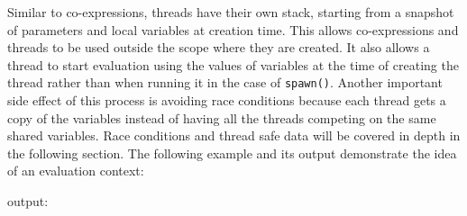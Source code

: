 Similar to co-expressions, threads have their own stack, starting from a
snapshot of parameters and local variables at creation time. This
allows co-expressions and threads to be used outside the scope where
they are created. It also allows a thread to start evaluation using the
values of variables at the time of creating the thread rather than when
running it in the case of \texttt{spawn()}. Another
important side effect of this process is avoiding race conditions
because each thread gets a copy of the variables instead of having all
the threads competing on the same shared variables. Race conditions and
thread safe data will be covered in depth in the following section. The
following example and its output demonstrate the idea of an evaluation
context:


\noindent
output:


